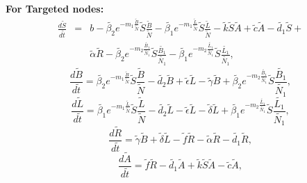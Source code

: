 \documentclass[conference]{IEEEtran}
\newcommand{\be}{\begin{equation}}
\newcommand{\ee}{\end{equation}}
\begin{document}
\textbf{For Targeted nodes:}\\
\begingroup
\everymath{\scriptstyle}
\scriptsize
\begin{eqnarray}
\frac{d\tilde{S}}{d\tilde{t}} &=& b-\tilde{\beta_2} e^{-m_1 \frac{\tilde{B}}{\tilde{N}}}\tilde{S} \frac{\tilde{B}}{\tilde{N}}-\tilde{\beta_1} e^{-m_1\frac{\tilde{L}}{\tilde{N}}} \tilde{S}\frac{\tilde{L}}{\tilde{N}}-\tilde{k}\tilde{S}\tilde{A}+\tilde{c}\tilde{A}-\tilde{d_1}\tilde{S} + \nonumber \\
&& \tilde{\alpha} \tilde{R}-\tilde{\beta_2} e^{-m_2 \frac{\tilde{B_1}}{\tilde{N_1}}} \tilde{S} \frac{\tilde{B_1}}{\tilde{N_1}} -\tilde{\beta_1} e^{-m_2 \frac{\tilde{L_1}}{\tilde{N_1}}} \tilde{S} \frac{\tilde{L_1}}{\tilde{N_1}},
\label{se1}
\end{eqnarray}
\endgroup
\begingroup
\everymath{\scriptstyle}
\scriptsize
\be
\frac{d\tilde{B}}{d\tilde{t}}=\tilde{\beta_2} e^{-m_1 \frac{\tilde{B}}{\tilde{N}}} \tilde{S}\frac{\tilde{B}}{\tilde{N}}-\tilde{d_2}\tilde{B}+\tilde{\epsilon} \tilde{L}-\tilde{\gamma} \tilde{B}+\tilde{\beta_2} e^{-m_2\frac{\tilde{B_1}}{\tilde{N_1}}}\tilde{S}
\frac{\tilde{B_1}}{\tilde{N_1}},
\label{se2}
\ee
\endgroup
\begingroup
\everymath{\scriptstyle}
\scriptsize
\be
\frac{d\tilde{L}}{d\tilde{t}}=\tilde{\beta_1} e^{-m_1\frac{\tilde{L}}{\tilde{N}}} \tilde{S}\frac{\tilde{L}}{\tilde{N}}-\tilde{d_2}\tilde{L}-\tilde{\epsilon}\tilde{L}-
\tilde{\delta} \tilde{L}+ \tilde{\beta_1} e^{-m_2\frac{\tilde{L_1}}{\tilde{N_1}}}\tilde{S}\frac{\tilde{L_1}}{\tilde{N_1}},
\label{se3}
\ee
\endgroup
\begingroup
\everymath{\scriptstyle}
\scriptsize
\be
\frac{d\tilde{R}}{d\tilde{t}}=\tilde{\gamma} \tilde{B}+\tilde{\delta}\tilde{L}-\tilde{f}\tilde{R}-\tilde{\alpha} \tilde{R}-\tilde{d_1}\tilde{R},
\label{se4}
\ee
\endgroup
\begingroup
\everymath{\scriptstyle}
\scriptsize
\be
\frac{d\tilde{A}}{d\tilde{t}}=\tilde{f}\tilde{R}-\tilde{d_1}\tilde{A}+ \tilde{k} \tilde{S}\tilde{A}-\tilde{c}\tilde{A},
\label{se5}
\ee
\endgroup
\end{document}
